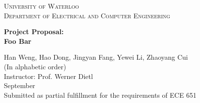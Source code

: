 \documentclass[12pt]{article}
\begin{document}
\begin{titlepage}
	\begin{center}
		{\hphantom{M}}
		\vspace{1cm}
		{\scshape\Huge{University of Waterloo}}\\
		\vspace{2cm}
		{\scshape\Large Department of Electrical and Computer Engineering}\\
		\vspace{1.5cm}
		\begin{spacing}{2.5}
		{\LARGE\bfseries Project Proposal:\\ Foo Bar}\\
		\end{spacing}
		\vspace{2cm}
		{\Large{Han Weng, Hao Dong, Jingyan Fang, Yewei Li, Zhaoyang Cui\\ (In alphabetic order) \vspace{1em} \\ Instructor: Prof. Werner Dietl}}
		\vspace{1cm}\\
		{\Large September}\\
		\vspace{4em}
		{\Large Submitted as partial fulfillment for the requirements of ECE 651}
	\end{center}
\end{titlepage}
\end{document}
